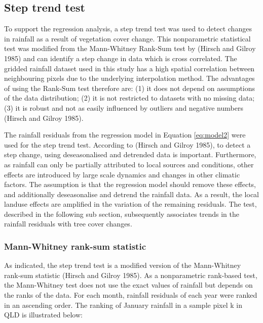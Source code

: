 \documentclass[]{elsarticle} %
\theoremstyle{definition}
\theoremstyle{definition}
\theoremstyle{definition}
\theoremstyle{remark}
\begin{document}
\subsection{Step trend test}\label{step-trend-test}

To support the regression analysis, a step trend test was used to detect
changes in rainfall as a result of vegetation cover change. This
nonparametric statistical test was modified from the Mann-Whitney
Rank-Sum test by (Hirsch and Gilroy 1985) and can identify a step change
in data which is cross correlated. The gridded rainfall dataset used in
this study has a high spatial correlation between neighbouring pixels
due to the underlying interpolation method. The advantages of using the
Rank-Sum test therefore are: (1) it does not depend on assumptions of
the data distribution; (2) it is not restricted to datasets with no
missing data; (3) it is robust and not as easily influenced by outliers
and negative numbers (Hirsch and Gilroy 1985).

The rainfall residuals from the regression model in Equation
\eqref{eq:model2} were used for the step trend test. According to (Hirsch
and Gilroy 1985), to detect a step change, using deseasonalised and
detrended data is important. Furthermore, as rainfall can only be
partially attributed to local sources and conditions, other effects are
introduced by large scale dynamics and changes in other climatic
factors. The assumption is that the regression model should remove these
effects, and additionally deseasonalise and detrend the rainfall data.
As a result, the local landuse effects are amplified in the variation of
the remaining residuals. The test, described in the following sub
section, subsequently associates trends in the rainfall residuals with
tree cover changes.

\subsubsection{Mann-Whitney rank-sum
statistic}\label{mann-whitney-rank-sum-statistic}

As indicated, the step trend test is a modified version of the
Mann-Whitney rank-sum statistic (Hirsch and Gilroy 1985). As a
nonparametric rank-based test, the Mann-Whitney test does not use the
exact values of rainfall but depends on the ranks of the data. For each
month, rainfall residuals of each year were ranked in an ascending
order. The ranking of January rainfall in a sample pixel k in QLD is
illustrated below:
\end{document}
